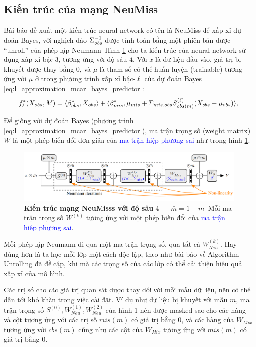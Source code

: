 \subsection{Kiến trúc của mạng NeuMiss}
Bài báo \cite{le2020neumiss} đề xuất một kiến trúc neural network có tên là NeuMiss để xấp xỉ dự đoán Bayes, với nghịch đảo $\Sigma_{obs}^{-1}$ được tính toán bằng một phiên bản được ``unroll'' của phép lặp Neumann. Hình \ref{fig:neumiss} cho ta kiến trúc của neural network sử dụng xấp xỉ bậc-$3$, tương ứng với độ sâu $4$. Với $x$ là dữ liệu đầu vào, giá trị bị khuyết được thay bằng $0$, và $\mu$ là tham số có thể huấn luyện (trainable) tương ứng với $\mu$ ở trong phương trình xấp xỉ bậc-$\ell$ của dự đoán Bayes \eqref{eq:l_approximation_mcar_bayes_predictor}:
\[
    f_{\ell}^* (X_{obs}, M) = \langle\beta_{obs}^{*},X_{obs} \rangle+\langle\beta_{mis}^{*},\mu_{mis} + \Sigma_{mis,obs} S_{obs(m)}^{(\ell)}(X_{obs}-\mu_{obs})\rangle,
\]

Để giống với dự đoán Bayes (phương trình 
\eqref{eq:l_approximation_mcar_bayes_predictor}), 
ma trận trọng số (weight matrix) $W$ là một phép biến đổi đơn giản của \textcolor{blue}{ma trận hiệp phương sai} như trong hình \ref{fig:neumiss}.


\begin{figure}[h]
    \centering
    \includegraphics[width=\textwidth]{img/neumiss_network.png}
    \caption{
        \textbf{Kiến trúc mạng NeuMisss với độ sâu $4$} --- $\bar{m} = 1 - m$. Mỗi ma trận trọng số $W^{(k)}$ tương ứng với một phép biến đổi của \textcolor{blue}{ma trận hiệp phương sai}.
    }
    \label{fig:neumiss}
\end{figure}


Mỗi phép lặp Neumann đi qua một ma trận trọng số, qua tất cả $W^{(k)}_{Neu}$. Hay đúng hơn là ta học mỗi lớp một cách độc lập, theo như bài báo về Algorithm Unrolling \cite{gregor2010unroll} đã đề cập, khi mà các trọng số của các lớp có thể cải thiện hiệu quả xấp xỉ của mô hình.

Các trị số cho các giá trị quan sát được thay đổi với mỗi mẫu dữ liệu, nên 
có thể dẫn tới khó khăn trong việc cài đặt. 
Ví dụ như dữ liệu bị khuyết với mẫu $m$, ma trận trọng số $S^{(0)}, W_{Neu}^{(1)}, W_{Neu}^{(2)}$ của hình \ref{fig:neumiss} nên được masked sao cho các hàng và cột tương ứng với các trị số $mis(m)$ có giá trị bằng $0$, và các hàng của $W_{Mix}$ tương ứng với $obs(m)$ cũng như các cột của $W_{Mix}$ tương ứng với $mis(m)$ có giá trị bằng $0$.

